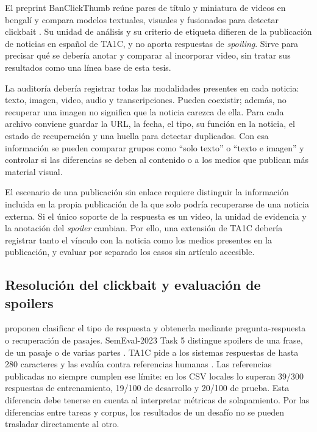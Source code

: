 El preprint BanClickThumb reúne pares de título y miniatura de videos en bengalí y compara modelos textuales, visuales y fusionados para detectar clickbait \citep{islam2026banclickthumb}. Su unidad de análisis y su criterio de etiqueta difieren de la publicación de noticias en español de TA1C, y no aporta respuestas de \emph{spoiling}. Sirve para precisar qué se debería anotar y comparar al incorporar video, sin tratar sus resultados como una línea base de esta tesis.

La auditoría debería registrar todas las modalidades presentes en cada noticia: texto, imagen, video, audio y transcripciones. Pueden coexistir; además, no recuperar una imagen no significa que la noticia carezca de ella. Para cada archivo conviene guardar la URL, la fecha, el tipo, su función en la noticia, el estado de recuperación y una huella para detectar duplicados. Con esa información se pueden comparar grupos como ``solo texto'' o ``texto e imagen'' y controlar si las diferencias se deben al contenido o a los medios que publican más material visual.

El escenario de una publicación sin enlace requiere distinguir la información incluida en la propia publicación de la que solo podría recuperarse de una noticia externa. Si el único soporte de la respuesta es un video, la unidad de evidencia y la anotación del \emph{spoiler} cambian. Por ello, una extensión de TA1C debería registrar tanto el vínculo con la noticia como los medios presentes en la publicación, y evaluar por separado los casos sin artículo accesible.

\subsection{Resolución del clickbait y evaluación de spoilers}
\label{sec:spoiling}

\citet{hagen2022} proponen clasificar el tipo de respuesta y obtenerla mediante pregunta-respuesta o recuperación de pasajes. SemEval-2023 Task 5 distingue spoilers de una frase, de un pasaje o de varias partes \citep{frobe2023}. TA1C pide a los sistemas respuestas de hasta 280 caracteres y las evalúa contra referencias humanas \citep{ta1c2025}. Las referencias publicadas no siempre cumplen ese límite: en los CSV locales lo superan 39/300 respuestas de entrenamiento, 19/100 de desarrollo y 20/100 de prueba. Esta diferencia debe tenerse en cuenta al interpretar métricas de solapamiento. Por las diferencias entre tareas y corpus, los resultados de un desafío no se pueden trasladar directamente al otro.

